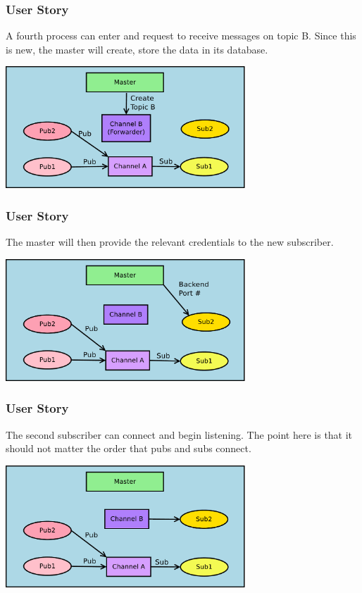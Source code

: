 \documentclass[xcolor=svgnames]{beamer}
\begin{document}
\begin{frame}[fragile]
  \frametitle{User Story}
  A fourth process can enter and request to receive messages on topic B.  
  Since this is new, the master will create, store the data in its database.
\begin{center}
\includegraphics[width=9cm]{./Diagram11.pdf}
\end{center}
\end{frame}



\begin{frame}[fragile]
  \frametitle{User Story}
  The master will then provide the relevant credentials to the new 
  subscriber.
\begin{center}
\includegraphics[width=9cm]{./Diagram12.pdf}
\end{center}
\end{frame}




\begin{frame}[fragile]
  \frametitle{User Story}
  
  The second subscriber can connect and begin listening.   The point here
 is that it should not matter the order that pubs and subs connect.
\begin{center}
\includegraphics[width=9cm]{./Diagram13.pdf}
\end{center}
\end{frame}
\end{document}
